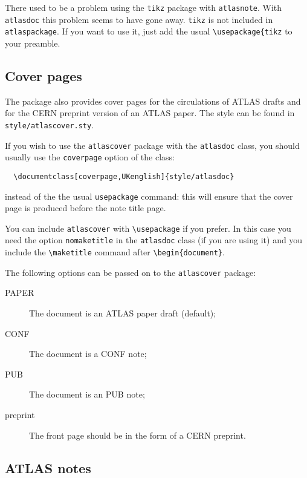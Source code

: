 \documentclass[koma,UKenglish]{style/atlasdoc}
\newcommand{\Macro}[1]{\texttt{\textbackslash #1}\xspace}
\newcommand{\Package}[1]{\texttt{#1}\xspace}
\begin{document}
There used to be a problem using the \texttt{tikz} package with \texttt{atlasnote}.
With \texttt{atlasdoc} this problem seems to have gone away.
\texttt{tikz} is not included in \texttt{atlaspackage}.
If you want to use it, just add the usual \verb|\usepackage{tikz| to your preamble.


\subsection{Cover pages}
\label{sec:cover}

The package also provides cover pages for the circulations of ATLAS drafts and 
for the CERN preprint version of an ATLAS paper. The style can be found in \texttt{style/atlascover.sty}.

If you wish to use the \texttt{atlascover} package with the 
\texttt{atlasdoc} class, you should usually use the \texttt{coverpage} option of the class:
\begin{verbatim}
  \documentclass[coverpage,UKenglish]{style/atlasdoc}
\end{verbatim}
instead of the the usual \texttt{usepackage} command: this will ensure
that the cover page is produced before the note title page.

You can include \texttt{atlascover} with \Macro{usepackage} if you prefer.
In this case you need the option \texttt{nomaketitle} in the \texttt{atlasdoc} class
(if you are using it)
and you include the \Macro{maketitle} command after \verb|\begin{document}|.

The following options can be passed on to the \Package{atlascover} package:
\begin{description}
\item[PAPER] The document is an ATLAS paper draft (default);
\item[CONF] The document is a CONF note;
\item[PUB] The document is an PUB note;
\item[preprint] The front page should be in the form of a CERN preprint.
\end{description}

\subsection{ATLAS notes}
\label{sec:note}
\end{document}
